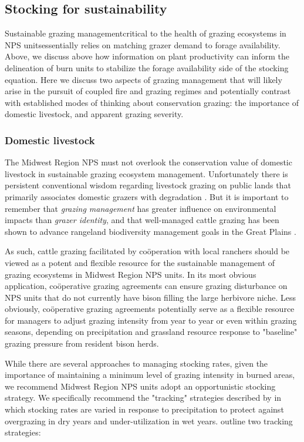\subsection{Stocking for sustainability}

Sustainable grazing management\textemdash critical to the health of grazing ecosystems in NPS units\textemdash essentially relies on matching grazer demand to forage availability. 
Above, we discuss above how information on plant productivity can inform the delineation of burn units to stabilize the forage availability side of the stocking equation. 
Here we discuss two aspects of grazing management that will likely arise in the pursuit of coupled fire and grazing regimes and potentially contrast with established modes of thinking about conservation grazing: the importance of domestic livestock, and apparent grazing severity. 

\subsubsection{Domestic livestock}

The Midwest Region NPS must not overlook the conservation value of domestic livestock in sustainable grazing ecosystem management.
Unfortunately there is persistent conventional wisdom regarding livestock grazing on public lands that primarily associates domestic grazers with degradation \citep{fleischner1994}. 
But it is important to remember that \emph{grazing management} has greater influence on environmental impacts than \emph{grazer identity}, and that well-managed cattle grazing has been shown to advance rangeland biodiversity management goals in the Great Plains \citep{ahlering2016, allred2011}. 

As such, cattle grazing facilitated by co\"{o}peration with local ranchers should be viewed as a potent and flexible resource for the sustainable management of grazing ecosystems in Midwest Region NPS units. 
In its most obvious application, co\"{o}perative grazing agreements can ensure grazing disturbance on NPS units that do not currently have bison filling the large herbivore niche. 
Less obviously, co\"{o}perative grazing agreements potentially serve as a flexible resource for managers to adjust grazing intensity from year to year or even within grazing seasons, depending on precipitation and grassland resource response to "baseline" grazing pressure from resident bison herds. 

While there are several approaches to managing stocking rates, given the importance of maintaining a minimum level of grazing intensity in burned areas, we recommend Midwest Region NPS units adopt an opportunistic stocking strategy. 
We specifically recommend the "tracking" strategies described by \citet{campbell2006} in which stocking rates are varied in response to precipitation to protect against overgrazing in dry years and under-utilization in wet years. 
\citet{campbell2006} outline two tracking strategies: 

